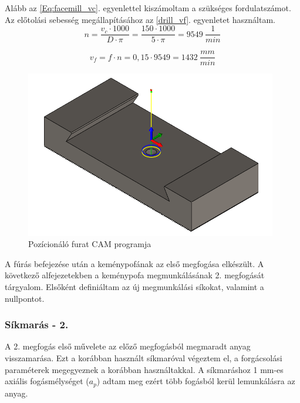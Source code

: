 \documentclass[12pt,a4paper,oneside]{report}
\begin{document}
Alább az \ref{Eq:facemill_vc}. egyenlettel kiszámoltam a szükséges fordulatszámot. Az előtolási sebesség megállapításához az \ref{drill_vf}. egyenletet használtam.
\begin{equation*}
    n=\dfrac{v_c\cdot1000}{D\cdot\pi}=\dfrac{150\cdot1000}{5\cdot\pi}=9549\ \dfrac{1}{min}
\end{equation*}

\begin{equation}\label{drill_vf}
    v_f=f\cdot n=0,15\cdot 9549=1432\ \dfrac{mm}{min}
\end{equation}

\begin{figure}[H]
    \centering
    \includegraphics[width=11cm]{figures/kemenypofa_drill.png}
    \caption{Pozícionáló furat CAM programja}
    \label{Fig:kemenypofa_drill}
\end{figure}

A fúrás befejezése után a keménypofának az első megfogása elkészült. A következő alfejezetekben a keménypofa megmunkálásának 2. megfogását tárgyalom. Elsőként definiáltam az új megmunkálási síkokat, valamint a nullpontot.

\subsubsection{Síkmarás - 2.}
A 2. megfogás első művelete az előző megfogásból megmaradt anyag visszamarása. Ezt a korábban használt síkmaróval végeztem el, a forgácsolási paraméterek megegyeznek a korábban használtakkal. A síkmaráshoz 1 mm-es axiális fogásmélységet ($a_p$) adtam meg ezért több fogásból kerül lemunkálásra az anyag.
\end{document}
